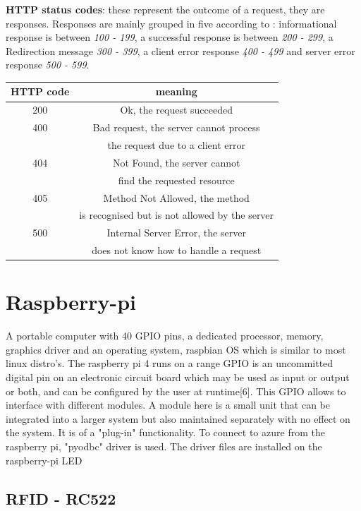 \textbf{HTTP status codes}: these represent the outcome of a request, they are responses. Responses are mainly grouped in five according to \cite{HTTPresp7:online}:  informational response is between \textit{100 - 199}, a successful response is between \textit{200 - 299}, a Redirection message \textit{300 - 399}, a client error response \textit{400 - 499} and server error response \textit{500 - 599}.
\begin{center}
  \begin{tabular}{|c|  c   |}
    \hline
    \textbf{HTTP code} & meaning\\
    \hline
    200 & Ok, the request succeeded\\
    \hline
    400 & Bad request, the server cannot process\\
    &the request due to a client error\\
    \hline
    404 & Not Found, the server cannot\\
    &find the requested resource\\
    \hline
    405 & Method Not Allowed, the method\\
    &is recognised but is not allowed by the server\\
    \hline
    500 & Internal Server Error, the server\\
     &does not know how to handle a request\\
    \hline
  \end{tabular}
\end{center}

 
\section{Raspberry-pi}
A portable computer with 40 GPIO pins, a dedicated processor, memory, graphics driver and an operating system, raspbian OS which is similar to most linux distro's. The raspberry pi 4 runs on a range \cite{Arduinov52:online}
GPIO is an uncommitted digital pin on an electronic circuit board which may be used as input or output or both, and can be configured by the user at runtime[6]. This GPIO allows to interface with different modules. A module here is a small unit that can be integrated into a larger system but also maintained separately with no effect on the system. It is of a "plug-in" functionality.
To connect to azure from the raspberry pi, "pyodbc" driver is used. The driver files are installed on the raspberry-pi
LED  

\subsection{RFID - RC522}
